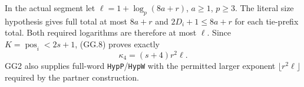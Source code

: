 In the actual segment let $\ell=1+\log_p(8a+r)$, $a\ge1$, $p\ge3$.
The literal size hypothesis gives full total at most $8a+r$ and
$2D_i+1\le8a+r$ for each tie-prefix total.
Both required logarithms are therefore at most $\ell$.
Since $K=\operatorname{pos}_i<2s+1$, (GG.8) proves exactly
\[
 \kappa_4=(s+4)r^2\ell.                                       \tag{GG.9}
\]
GG2 also supplies full-word \texttt{HypP}/\texttt{HypW} with the
permitted larger exponent $\lfloor r^2\ell\rfloor$ required by
the partner construction.
